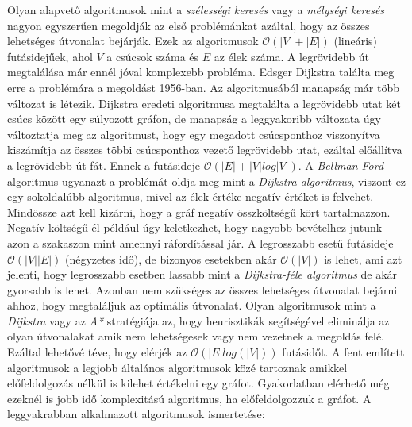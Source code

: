 \noindent Olyan alapvető algoritmusok mint a \textit{szélességi
keresés} vagy a \textit{mélységi keresés} nagyon egyszerűen megoldják az első problémánkat azáltal, hogy az összes lehetséges útvonalat bejárják. Ezek az algoritmusok $\mathcal{O}(|V| + |E|)$ (lineáris) futásidejűek, ahol $V$ a csúcsok száma és $E$ az élek száma.
\newline
\newline A legrövidebb út megtalálása már ennél jóval komplexebb probléma. 
\newline
\newline Edsger Dijkstra találta meg erre a problémára a megoldást 1956-ban. Az algoritmusából manapság már több változat is létezik. Dijkstra eredeti algoritmusa megtalálta a legrövidebb utat két csúcs között egy súlyozott gráfon, de manapság a leggyakoribb változata úgy változtatja meg az algoritmust, hogy egy megadott csúcsponthoz viszonyítva kiszámítja az összes többi csúcsponthoz vezető legrövidebb utat, ezáltal előállítva a legrövidebb út fát. Ennek a futásideje $\mathcal{O}(|E| + |V| log|V|)$. 
\newline
\newline A \textit{Bellman-Ford} algoritmus ugyanazt a problémát oldja meg mint a \textit{Dijkstra algoritmus}, viszont ez egy sokoldalúbb algoritmus, mivel az élek értéke negatív értéket is felvehet. Mindössze azt kell kizárni, hogy a gráf negatív összköltségű kört tartalmazzon. Negatív költségű él például úgy keletkezhet, hogy nagyobb bevételhez jutunk azon a szakaszon mint amennyi ráfordítással jár. A legrosszabb esetű futásideje $\mathcal{O}(|V||E|)$ (négyzetes idő), de bizonyos esetekben akár $\mathcal{O}(|V|)$ is lehet, ami azt jelenti, hogy legrosszabb esetben lassabb mint a \textit{Dijkstra-féle algoritmus} de akár gyorsabb is lehet. 
\newline
\newline Azonban nem szükséges az összes lehetséges útvonalat bejárni ahhoz, hogy megtaláljuk az optimális útvonalat. Olyan algoritmusok mint a \textit{Dijkstra} vagy az \textit{A*} stratégiája az, hogy heurisztikák segítségével eliminálja az olyan útvonalakat amik nem lehetségesek vagy nem vezetnek a megoldás felé. Ezáltal lehetővé téve, hogy elérjék az $\mathcal{O}(|E| log(|V|))$ futásidőt. 
\newline
\newline A fent említett algoritmusok a legjobb általános algoritmusok közé tartoznak amikkel előfeldolgozás nélkül is kilehet értékelni egy gráfot. Gyakorlatban elérhető még ezeknél is jobb idő komplexitású algoritmus, ha előfeldolgozzuk a gráfot.
\newline
\newline A leggyakrabban alkalmazott algoritmusok ismertetése:

